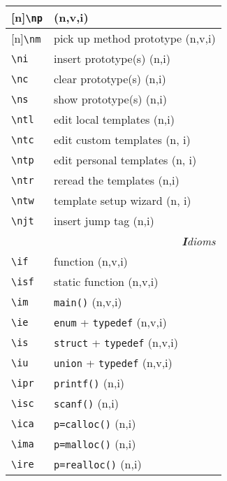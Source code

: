 \documentclass[oneside,11pt,landscape,DIV16]{scrartcl}
\newcommand{\Rep}{{\tiny{[n]}}}
\begin{document}
\begin{multicols}{3}
\begin{center}
\begin{tabular}[]{|p{11mm}|p{60mm}|}
       \Rep\verb'\np'  &                           \hfill (n,v,i)\\
\hline \Rep\verb'\nm'  & pick up method prototype  \hfill (n,v,i)\\
\hline     \verb'\ni'  & insert prototype(s)       \hfill (n,i)\\
\hline     \verb'\nc'  & clear  prototype(s)       \hfill (n,i)\\
\hline     \verb'\ns'  & show   prototype(s)       \hfill (n,i)\\
%
\hline     \verb'\ntl' & edit local templates      \hfill (n,i)\\
\hline     \verb'\ntc' & edit custom templates     \hfill (n, i)\\
\hline     \verb'\ntp' & edit personal templates   \hfill (n, i)\\
\hline     \verb'\ntr' & reread the templates      \hfill (n,i)\\
\hline     \verb'\ntw' & template setup wizard     \hfill (n, i)\\
\hline     \verb'\njt' & insert jump tag           \hfill (n,i)\\
\hline
\hline 
\multicolumn{2}{|r|}{\textsl{\textbf{I}dioms}}   \\
\hline \verb'\if'  & function                           \hfill (n,v,i)\\
\hline \verb'\isf' & static function                    \hfill (n,v,i)\\
\hline \verb'\im'  & \verb'main()'                      \hfill (n,v,i)\\
\hline \verb'\ie'  & \verb'enum'   + \verb'typedef'     \hfill (n,v,i)\\
\hline \verb'\is'  & \verb'struct' + \verb'typedef'     \hfill (n,v,i)\\
\hline \verb'\iu'  & \verb'union'  + \verb'typedef'     \hfill (n,v,i)\\
\hline \verb'\ipr' & \verb'printf()'                    \hfill (n,i)\\
\hline \verb'\isc' & \verb'scanf()'                     \hfill (n,i)\\
\hline \verb'\ica' & \verb'p=calloc()'                  \hfill (n,i)\\
\hline \verb'\ima' & \verb'p=malloc()'                  \hfill (n,i)\\
\hline \verb'\ire' & \verb'p=realloc()'                 \hfill (n,i)\\

\end{tabular}
\end{center}
\end{multicols}
\end{document}
